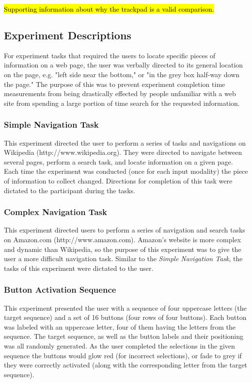 \documentclass{sigchi}
\begin{document}
\hl{Supporting information about why the trackpad is a valid comparison.}


\subsection{Experiment Descriptions}
For experiment tasks that required the users to locate specific pieces of information on a web page, the user was verbally directed to its general location on the page, e.g. "left side near the bottom," or "in the grey box half-way down the page." The purpose of this was to prevent experiment completion time measurements from being drastically effected by people unfamiliar with a web site from spending a large portion of time search for the requested information.

\subsubsection{Simple Navigation Task}
This experiment directed the user to perform a series of tasks and navigations on Wikipedia (http://www.wikipedia.org). They were directed to navigate between several pages, perform a search task, and locate information on a given page. Each time the experiment was conducted (once for each input modality) the piece of information to collect changed. Directions for completion of this task were dictated to the participant during the tasks.

\subsubsection{Complex Navigation Task}
This experiment directed users to perform a series of navigation and search tasks on Amazon.com (http://www.amazon.com). Amazon's website is more complex and dynamic than Wikipedia, so the purpose of this experiment was to give the user a more difficult navigation task. Similar to the \textit{Simple Navigation Task}, the tasks of this experiment were dictated to the user.

\subsubsection{Button Activation Sequence}
This experiment presented the user with a sequence of four uppercase letters (the target sequence) and a set of 16 buttons (four rows of four buttons). Each button was labeled with an uppercase letter, four of them having the letters from the sequence. The target sequence, as well as the button labels and their positioning was all randomly generated. As the user completed the selections in the given sequence the buttons would glow red (for incorrect selections), or fade to grey if they were correctly activated (along with the corresponding letter from the target sequence). 
\end{document}
